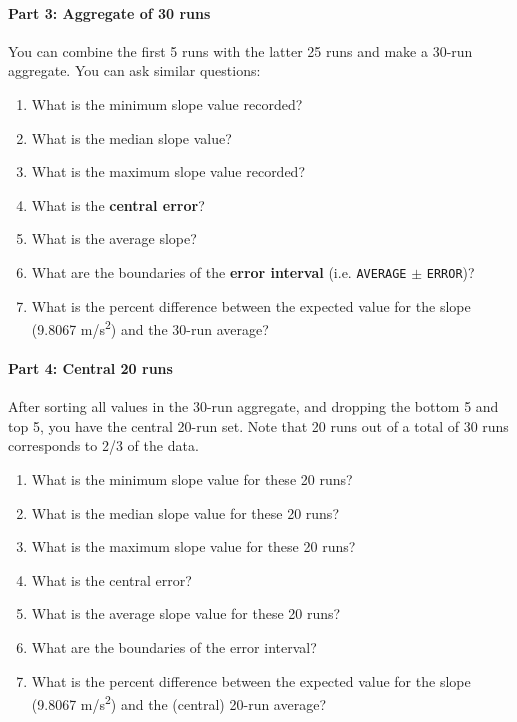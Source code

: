 \paragraph{Part 3: Aggregate of 30 runs}
%
You can combine the first 5 runs with the latter 25 runs and make a 30-run aggregate. You can ask similar questions:
\begin{enumerate}
    \item What is the minimum slope value recorded?
    \item What is the median slope value?
    \item What is the maximum slope value recorded?
    \item What is the \textbf{central error}?
    \item What is the average slope?
    \item What are the boundaries of the \textbf{error interval} (i.e. \texttt{AVERAGE} $\pm$ \texttt{ERROR})?
    \item What is the percent difference between the expected value for the slope (9.8067 m/s\textsuperscript{2}) and the 30-run average?
\end{enumerate}
%
\paragraph{Part 4: Central 20 runs}
%
After sorting all values in the 30-run aggregate, and dropping the bottom 5 and top 5, you have the central 20-run set. Note that 20 runs out of a total of 30 runs corresponds to 2/3 of the data.
\begin{enumerate}
    \item What is the minimum slope value for these 20 runs?
    \item What is the median slope value for these 20 runs?
    \item What is the maximum slope value for these 20 runs?
    \item What is the central error?
    \item What is the average slope value for these 20 runs?
    \item What are the boundaries of the error interval?
    \item What is the percent difference between the expected value for the slope (9.8067 m/s\textsuperscript{2}) and the (central) 20-run average?
\end{enumerate}
%
